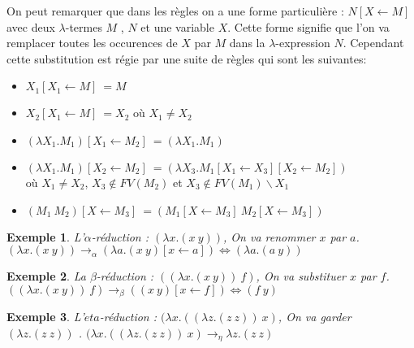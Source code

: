 \documentclass[10pt,a4paper]{report}
\newtheorem{ex}{Exemple}
\begin{document}
On peut remarquer que dans les règles on a une forme particulière : $N [X \leftarrow M]$ avec deux $\lambda$-termes $M$ ,
$N$ et une variable $X$. Cette forme signifie que l'on va remplacer toutes les occurences de $X$ par $M$ dans la $\lambda$-expression $N$.
Cependant cette substitution est régie par une suite de règles qui sont les suivantes: 
\begin{itemize}
\item $X_{1}[X_{1} \leftarrow M]~= M$
\item $X_{2}[X_{1} \leftarrow M]~= X_{2}$ où $X_{1}\neq X_{2}$
\item $(\lambda X_{1}.M_{1})[X_{1} \leftarrow M_{2}]~= (\lambda X_{1}.M_{1})$
\item $(\lambda X_{1}.M_{1})[X_{2} \leftarrow M_{2}]~= (\lambda X_{3}.M_{1}[X_{1} \leftarrow X_{3}][X_{2} \leftarrow M_{2}])$ 
  \\où $X_{1} \neq X_{2}$, $X_{3} \notin FV(M_{2})$ et $X_{3} \notin FV(M_{1})\backslash{X_{1}}$ 
\item $(M_{1}~M_{2})[X \leftarrow M_{3}]~=(M_{1}[X \leftarrow M_{3}]~M_{2}[X \leftarrow M_{3}])$
\end{itemize}
\bigbreak

\begin{ex} 
	L'$\alpha$-réduction : $(\lambda x.(x~y)) $, On va renommer $x$ par $a$. $(\lambda x.(x~y)) \rightarrow_{\alpha} (\lambda a.(x~y)[x \leftarrow a]) \Longleftrightarrow (\lambda a.(a~y))$ 	
\end{ex}

\begin{ex}
	La $\beta$-réduction : $((\lambda x.(x~y))~f)$, On va substituer $x$ par $f$. $((\lambda x.(x~y))~f) \rightarrow_{\beta} ((x~y)[x \leftarrow f]) \Longleftrightarrow (f~y)$ 
\end{ex}

\begin{ex}
	L'$eta$-réduction : $(\lambda x.((\lambda z.(z~z))~x)$, On va garder $(\lambda z.(z~z))$ . $(\lambda x.((\lambda z.(z~z))~x) \rightarrow_{\eta} \lambda z.(z~z)$ 
\end{ex}
\end{document}
